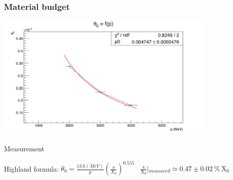\documentclass{beamer}
\begin{document}
  \begin{frame}
    \frametitle{Material budget}

    \vspace{-0.3cm}
    \begin{center}
      \includegraphics[width = 0.8\textwidth]{Pictures/theta0VsP_2-4GeV.png}
    \end{center}

    \vspace{-0.4cm}
    \begin{block}{Measurement}
      \begin{center}
      Highland formula: $\theta_0 = \frac{13.6 (MeV)}{p}\left( \frac{x}{X_0}\right)^{0.555}$
      \ 
       $\frac{\text{x}}{\text{X}_0}\left|_{measured} \simeq 0.47 \pm 0.02~\%~\text{X}_0 \right.$
      \end{center}
    \end{block}

  \end{frame}
\end{document}
